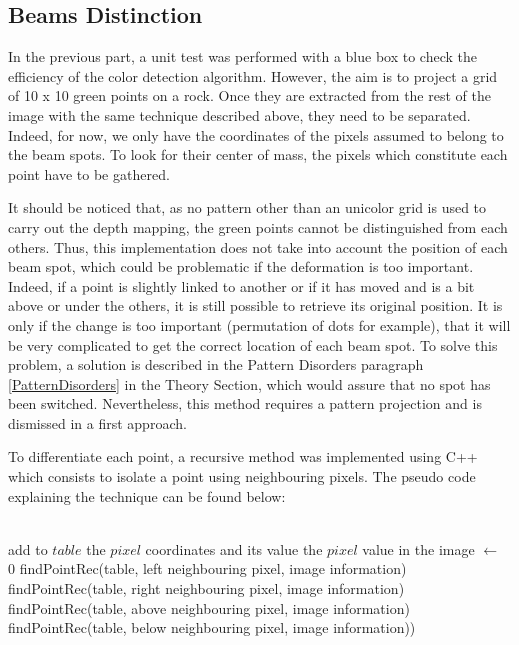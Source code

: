 \subsection{Beams Distinction}
In the previous part, a unit test was performed with a blue box to check the efficiency of the color detection algorithm. However, the aim is to project a grid of 10 x 10 green points on a rock. Once they are extracted from the rest of the image with the same technique described above, they need to be separated. Indeed, for now, we only have the coordinates of the pixels assumed to belong to the beam spots. To look for their center of mass, the pixels which constitute each point have to be gathered. 

It should be noticed that, as no pattern other than an unicolor grid is used to carry out the depth mapping, the green points cannot be distinguished from each others. Thus, this implementation does not take into account the position of each beam spot, which could be problematic if the deformation is too important. Indeed, if a point is slightly linked to another or if it has moved and is a bit above or under the others, it is still possible to retrieve its original position. It is only if the change is too important (permutation of dots for example), that it will be very complicated to get the correct location of each beam spot. To solve this problem, a solution is described in the Pattern Disorders paragraph \ref{PatternDisorders} in the Theory Section, which would assure that no spot has been switched. Nevertheless, this method requires a pattern projection and is dismissed in a first approach. 

To differentiate each point, a recursive method was implemented using C++ which consists to isolate a point using neighbouring pixels. The pseudo code explaining the technique can be found below:\\

\begin{algorithmic}
\\
    			\State add to $table$ the $pixel$ coordinates and its value
    			\State the $pixel$ value in the image $\gets$ 0
			\State findPointRec(table, left neighbouring pixel, image information)
			\State findPointRec(table, right neighbouring pixel, image information)
			\State findPointRec(table, above neighbouring pixel, image information)
			\State findPointRec(table, below neighbouring pixel, image information))
		\EndIf
\EndFunction
\end{algorithmic}

